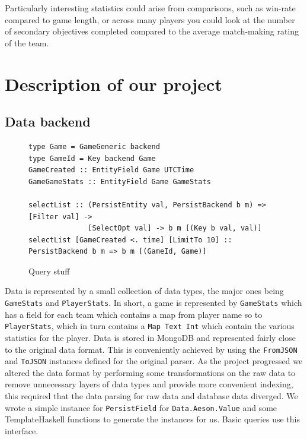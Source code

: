 \documentclass{chi2009}
\newcommand{\code}[1]{\texttt{#1}}
\begin{document}
Particularly interesting statistics could arise from comparisons, such as win-rate compared to game length, or across many players you could look at the number of secondary objectives completed compared to the average match-making rating of the team.

\section{Description of our project}
\label{package}

\subsection{Data backend}

\begin{figure}[t]
\begin{verbatim}
type Game = GameGeneric backend
type GameId = Key backend Game
GameCreated :: EntityField Game UTCTime
GameGameStats :: EntityField Game GameStats

selectList :: (PersistEntity val, PersistBackend b m) => [Filter val] ->
              [SelectOpt val] -> b m [(Key b val, val)]
selectList [GameCreated <. time] [LimitTo 10] :: PersistBackend b m => b m [(GameId, Game)]
\end{verbatim}
    \caption{Query stuff}
    \label{querycode}
\end{figure}

Data is represented by a small collection of data types, the major ones being \code{GameStats} and \code{PlayerStats}.  In short, a game is represented by \code{GameStats} which has a field for each team which contains a map from player name so to \code{PlayerStats}, which in turn contains a \code{Map Text Int} which contain the various statistics for the player.  Data is stored in MongoDB and represented fairly close to the original data format.  This is conveniently achieved by using the \code{FromJSON} and \code{ToJSON} instances defined for the original parser.  As the project progressed we altered the data format by performing some transformations on the raw data to remove unnecessary layers of data types and provide more convenient indexing, this required that the data parsing for raw data and database data diverged.  We wrote a simple instance for \code{PersistField} for \code{Data.Aeson.Value} and some TemplateHaskell functions to generate the instances for us.  Basic queries use this interface.
\end{document}
